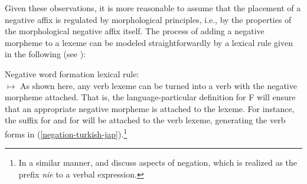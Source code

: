 \documentclass[output=paper
	        ,collection
	        ,collectionchapter
 	        ,biblatex
                ,babelshorthands
                ,newtxmath
                ,draftmode
                ,colorlinks, citecolor=brown
]{langscibook}
\begin{document}
\begin{exe}
\begin{xlist}
\begin{exe}
\begin{xlist}
Given these observations, it is more reasonable to assume that the placement of a
negative affix is regulated by morphological principles, i.e., by
the properties of the morphological negative affix itself.
%
%
The process of adding a negative morpheme to a lexeme can be modeled
straightforwardly by a lexical rule given in the following (see \citealt{Kim:00,Crowgey:12}):

\ea
\label{lr-neg-word-formation}
Negative word formation lexical rule:\\
 $\mapsto$
\z
%
%
As shown here, any verb lexeme can be turned into a verb with the negative
morpheme attached. That is, the language-particular definition for
F will ensure that an appropriate
negative morpheme is attached to the lexeme. For instance, the
suffix  for 
and  for  will be attached to the
 verb lexeme, generating
the verb forms in (\ref{negation-turkish-jap}).\footnote{In a similar
manner, \citet{PK:99} and \citet{Prz:00, Prz:01}
discuss aspects of  negation, which is realized as the prefix
  \emph{nie} to a verbal expression.}
%


\end{xlist}
\end{exe}
\end{xlist}
\end{exe}
\end{document}
